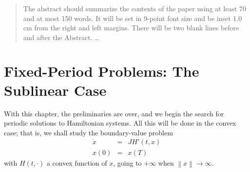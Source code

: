 \documentclass{llncs}
\begin{document}
    \maketitle
    \makeatletter
    \renewenvironment{thebibliography}[1]
         {\section*{\refname}
          \small
          \list{}%
               {\settowidth\labelwidth{}%
                \leftmargin\parindent
                \itemindent=-\parindent
                \labelsep=\z@
                \if@openbib
                  \advance\leftmargin\bibindent
                  \itemindent -\bibindent
                  \listparindent \itemindent
                  \parsep \z@
                \fi
                \usecounter{enumiv}%
                \let\p@enumiv\@empty
                \renewcommand\theenumiv{}}%
          \if@openbib
            \renewcommand\newblock{\par}%
          \else
            \renewcommand\newblock{\hskip .11em \@plus.33em \@minus.07em}%
          \fi
          \sloppy\clubpenalty4000\widowpenalty4000%
          \sfcode`\.=\@m}
         {\def\@noitemerr
           {\@latex@warning{Empty `thebibliography' environment}}%
          \endlist}
          \def\@cite#1{#1}%
          \def\@lbibitem[#1]#2{\item[]\if@filesw
            {\def\protect##1{\string ##1\space}\immediate
          \write\@auxout{\string\bibcite{#2}{#1}}}\fi\ignorespaces}
    \makeatother
    \begin{abstract}
    The abstract should summarize the contents of the paper
    using at least 70 and at most 150 words. It will be set in 9-point
    font size and be inset 1.0 cm from the right and left margins.
    There will be two blank lines before and after the Abstract. \dots
    \end{abstract}
    \section{Fixed-Period Problems: The Sublinear Case}
    With this chapter, the preliminaries are over, and we begin the search
    for periodic solutions to Hamiltonian systems. All this will be done in
    the convex case; that is, we shall study the boundary-value problem
    \begin{eqnarray*}
      \dot{x}&=&JH' (t,x)\\
      x(0) &=& x(T)
    \end{eqnarray*}
    with $H(t,\cdot)$ a convex function of $x$, going to $+\infty$ when
    $\left\|x\right\| \to \infty$.
    
\end{document}
